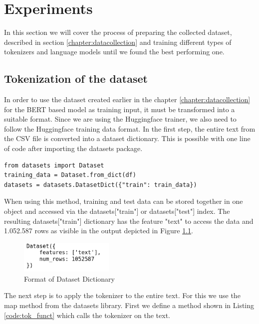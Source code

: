 \chapter{Experiments} \label{chapter:experiments}
In this section we will cover the process of preparing the collected dataset, described in section \ref{chapter:datacollection} and training different types of tokenizers and language models until we found the best performing one.

\section{Tokenization of the dataset}\label{chapter:data_chunking}
In order to use the dataset created earlier in the chapter \ref{chapter:datacollection} for the BERT based model as training input, it must be transformed into a suitable format. Since we are using the Huggingface trainer, we also need to follow the Huggingface training data format. \newline
In the first step, the entire text from the CSV file is converted into a dataset dictionary. This is possible with one line of code after importing the datasets package.

\begin{code}
\label{code:dict}
\begin{verbatim}
from datasets import Dataset
training_data = Dataset.from_dict(df)
datasets = datasets.DatasetDict({"train": train_data})
	\end{verbatim}
\end{code}

When using this method, training and test data can be stored together in one object and accessed via the datasets["train"] or datasets["test"] index. The resulting datasets["train"] dictionary has the feature "text" to access the data and 1.052.587 rows as visible in the output depicted in Figure \ref{fig:dict_features}.
\begin{figure}[H]
	\centering
	\includegraphics[width=0.4\textwidth]{figures/dataset_dict_features.png}
	\caption{Format of Dataset Dictionary}
	\label{fig:dict_features}
\end{figure}

The next step is to apply the tokenizer to the entire text. For this we use the map method from the datasets library. First we define a method shown in Listing \ref{code:tok_funct} which calls the tokenizer on the text.

